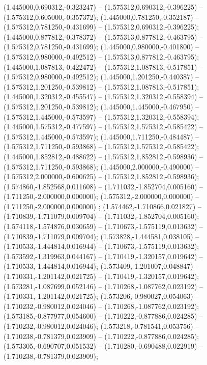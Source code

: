  (1.445000,0.690312,-0.323247) -- (1.575312,0.690312,-0.396225) -- (1.575312,0.605000,-0.357372);
 (1.445000,0.781250,-0.352187) -- (1.575312,0.781250,-0.431699) -- (1.575312,0.690312,-0.396225);
 (1.445000,0.877812,-0.378372) -- (1.575313,0.877812,-0.463795) -- (1.575312,0.781250,-0.431699);
 (1.445000,0.980000,-0.401800) -- (1.575312,0.980000,-0.492512) -- (1.575313,0.877812,-0.463795);
 (1.445000,1.087813,-0.422472) -- (1.575312,1.087813,-0.517851) -- (1.575312,0.980000,-0.492512);
 (1.445000,1.201250,-0.440387) -- (1.575312,1.201250,-0.539812) -- (1.575312,1.087813,-0.517851);
 (1.445000,1.320312,-0.455547) -- (1.575312,1.320312,-0.558394) -- (1.575312,1.201250,-0.539812);
 (1.445000,1.445000,-0.467950) -- (1.575312,1.445000,-0.573597) -- (1.575312,1.320312,-0.558394);
 (1.445000,1.575312,-0.477597) -- (1.575312,1.575312,-0.585422) -- (1.575312,1.445000,-0.573597);
 (1.445000,1.711250,-0.484487) -- (1.575312,1.711250,-0.593868) -- (1.575312,1.575312,-0.585422);
 (1.445000,1.852812,-0.488622) -- (1.575312,1.852812,-0.598936) -- (1.575312,1.711250,-0.593868);
 (1.445000,2.000000,-0.490000) -- (1.575312,2.000000,-0.600625) -- (1.575312,1.852812,-0.598936);
 (1.574860,-1.852568,0.011608) -- (1.711032,-1.852704,0.005160) -- (1.711250,-2.000000,0.000000);
 (1.575312,-2.000000,0.000000) -- (1.711250,-2.000000,0.000000) ;
 (1.574462,-1.710866,0.021827) -- (1.710839,-1.711079,0.009704) -- (1.711032,-1.852704,0.005160);
 (1.574118,-1.574876,0.030659) -- (1.710673,-1.575119,0.013632) -- (1.710839,-1.711079,0.009704);
 (1.573828,-1.444581,0.038105) -- (1.710533,-1.444814,0.016944) -- (1.710673,-1.575119,0.013632);
 (1.573592,-1.319963,0.044167) -- (1.710419,-1.320157,0.019642) -- (1.710533,-1.444814,0.016944);
 (1.573409,-1.201007,0.048847) -- (1.710331,-1.201142,0.021725) -- (1.710419,-1.320157,0.019642);
 (1.573281,-1.087699,0.052146) -- (1.710268,-1.087762,0.023192) -- (1.710331,-1.201142,0.021725);
 (1.573206,-0.980027,0.054063) -- (1.710232,-0.980012,0.024046) -- (1.710268,-1.087762,0.023192);
 (1.573185,-0.877977,0.054600) -- (1.710222,-0.877886,0.024285) -- (1.710232,-0.980012,0.024046);
 (1.573218,-0.781541,0.053756) -- (1.710238,-0.781379,0.023909) -- (1.710222,-0.877886,0.024285);
 (1.573305,-0.690707,0.051532) -- (1.710280,-0.690488,0.022919) -- (1.710238,-0.781379,0.023909);
